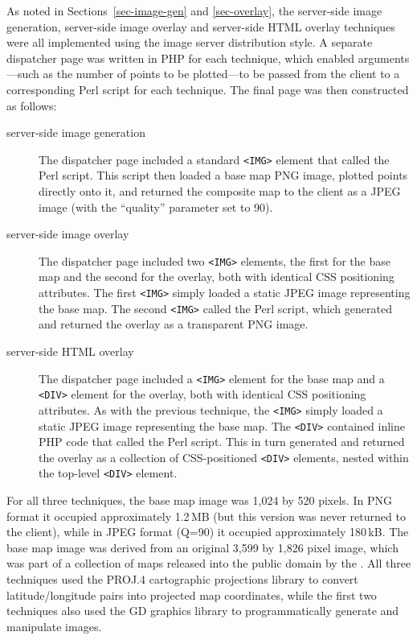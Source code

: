 \documentclass[acmtocl,acmnow]{acmtrans2m}
\begin{document}
As noted in Sections~\ref{sec-image-gen} and \ref{sec-overlay}, the
server-side image generation, server-side image overlay and server-side
HTML overlay techniques were all implemented using the image server
distribution style. A separate dispatcher page was written in PHP for
each technique, which enabled arguments---such as the number of points
to be plotted---to be passed from the client to a corresponding Perl
script for each technique. The final page was then constructed as
follows:
\begin{description}

	\item[server-side image generation] The dispatcher page included a
	standard \verb|<IMG>| element that called the Perl script. This
	script then loaded a base map PNG image, plotted points directly
	onto it, and returned the
	composite map to the client as a JPEG image (with the ``quality''
	parameter set to 90).

	\item[server-side image overlay] The dispatcher page included two
	\verb|<IMG>| elements, the first for the base map and the second for
	the overlay, both with identical CSS positioning attributes. The
	first \verb|<IMG>| simply loaded a static JPEG image representing
	the base map. The second \verb|<IMG>| called the Perl script, which
	generated and returned the overlay as a transparent PNG image.

	\item[server-side HTML overlay] The dispatcher page included a
	\verb|<IMG>| element for the base map and a \verb|<DIV>| element for
	the overlay, both with identical CSS positioning attributes. As with
	the previous technique, the \verb|<IMG>| simply loaded a static JPEG
	image representing the base map. The \verb|<DIV>| contained inline
	PHP code that called the Perl script. This in turn generated and
	returned the overlay as a collection of CSS-positioned \verb|<DIV>|
	elements, nested within the top-level \verb|<DIV>| element.

\end{description}

For all three techniques, the base map image was 1,024 by 520 pixels. In
PNG format it occupied approximately 1.2\,MB (but this version was never
returned to the client), while in JPEG format (Q=90) it occupied
approximately 180\,kB. The base map image was derived from an original
3,599 by 1,826 pixel image, which was part of a collection of maps
released into the public domain by the . All three
techniques used the PROJ.4 cartographic projections library to convert
latitude/longitude pairs into projected map coordinates, while the first
two techniques also used the GD graphics library to programmatically
generate and manipulate images.
\end{document}
